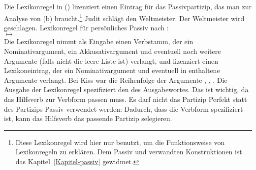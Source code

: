 Die Lexikonregel in () lizenziert einen Eintrag für das Passivpartizip,
das man zur Analyse von (b) braucht.\footnote{
  Diese Lexikonregel wird hier nur benutzt, um die Funktionsweise von Lexikonregeln zu erklären.
  Dem Passiv und verwandten Konstruktionen ist das Kapitel~\ref{Kapitel-passiv} gewidmet.%
}
\eal
\ex Judit schlägt den Weltmeister.
\ex Der Weltmeister wird geschlagen.
\zl
\ea
\label{pass-lr-mlr}
Lexikonregel für persönliches Passiv nach \citet{Kiss92}:\\
 $\mapsto$ \\
\hfill{}
\z
Die Lexikonregel nimmt als Eingabe einen Verbstamm, der ein Nominativargument, ein Akkusativargument
und eventuell noch weitere Argumente (falls  
nicht die leere Liste ist) verlangt, und lizenziert einen Lexikoneintrag, der ein Nominativargument 
und eventuell in  enthaltene Argumente verlangt. Bei Kiss war die Reihenfolge der Argumente
, , . Die Ausgabe der Lexikonregel spezifiziert
den \vformw des Ausgabewortes. Das ist wichtig, da das Hilfsverb zur Verbform passen muss. Es darf \zb
nicht das Partizip Perfekt statt des Partizips Passiv verwendet werden:
\eal
{}
\zl
Dadurch, dass die Verbform spezifiziert ist, kann das Hilfsverb das passende Partizip selegieren.

